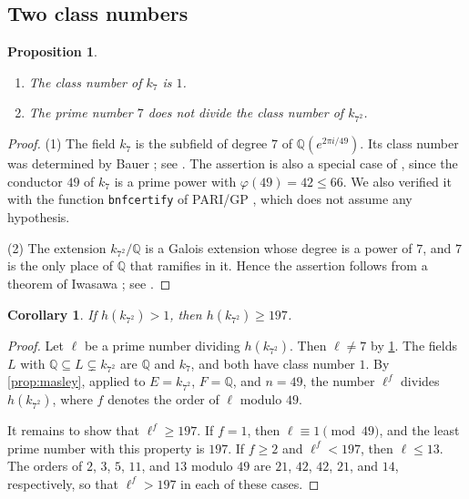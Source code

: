 \documentclass[11pt]{amsart}
\theoremstyle{plain}
\newtheorem{proposition}[theorem]{Proposition}
\newtheorem{corollary}[theorem]{Corollary}
\theoremstyle{definition}
\begin{document}
\subsection{Two class numbers}

\begin{proposition} \label{prop:known}
\begin{enumerate}
\item The class number of $k_7$ is $1$.
\item The prime number $7$ does not divide the class number of $k_{7^2}$.
\end{enumerate}
\end{proposition}

\begin{proof}
(1) The field $k_7$ is the subfield of degree $7$ of $\mathbb{Q}(e^{2\pi i/49})$. Its class number was determined by Bauer \cite{Ba69}; see \cite[Table 1]{Mi15b}.
The assertion is also a special case of \cite[Theorem 1]{vdL82}, since the conductor $49$ of $k_7$ is a prime power with $\varphi(49) = 42 \le 66$.
We also verified it with the function \texttt{bnfcertify} of PARI/GP \cite{PARI}, which does not assume any hypothesis.

(2) The extension $k_{7^2}/\mathbb{Q}$ is a Galois extension whose degree is a power of $7$, and $7$ is the only place of $\mathbb{Q}$ that ramifies in it.
Hence the assertion follows from a theorem of Iwasawa \cite{Iw56}; see \cite[Theorem 10.4]{Wa97}.
\end{proof}

\begin{corollary} \label{cor:197}
If $h(k_{7^2}) > 1$, then $h(k_{7^2}) \ge 197$.
\end{corollary}

\begin{proof}
Let $\ell$ be a prime number dividing $h(k_{7^2})$.
Then $\ell \ne 7$ by \cref{prop:known}.
The fields $L$ with $\mathbb{Q} \subseteq L \subsetneq k_{7^2}$ are $\mathbb{Q}$ and $k_7$, and both have class number $1$.
By \cref{prop:masley}, applied to $E = k_{7^2}$, $F = \mathbb{Q}$, and $n = 49$, the number $\ell^f$ divides $h(k_{7^2})$, where $f$ denotes the order of $\ell$ modulo $49$.

It remains to show that $\ell^f \ge 197$.
If $f = 1$, then $\ell \equiv 1 \pmod{49}$, and the least prime number with this property is $197$.
If $f \ge 2$ and $\ell^f < 197$, then $\ell \le 13$.
The orders of $2$, $3$, $5$, $11$, and $13$ modulo $49$ are $21$, $42$, $42$, $21$, and $14$, respectively, so that $\ell^f > 197$ in each of these cases.
\end{proof}
\end{document}
